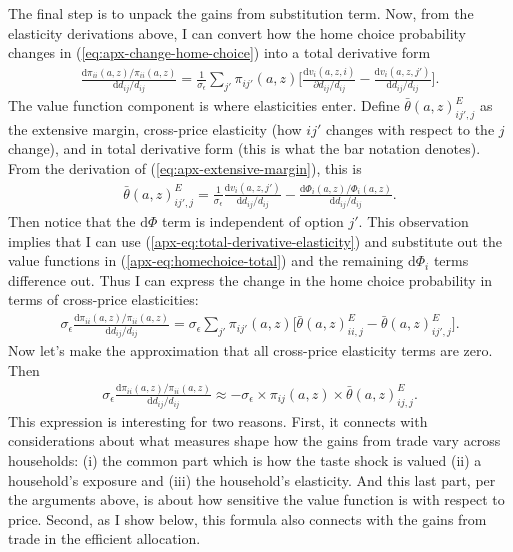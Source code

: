 \documentclass[12pt,pdftex]{article}
\begin{document}
\begin{onehalfspacing}
The final step is to unpack the gains from substitution term. Now, from the elasticity derivations above, I can convert how the home choice probability changes in (\ref{eq:apx-change-home-choice}) into a total derivative form
\begin{align}
\frac{\mathrm{d} \pi_{ii}(a,z) / \pi_{ii}(a,z) }{\mathrm{d} d_{ij} / d_{ij}} = \frac{1}{\sigma_{\epsilon}} \sum_{j'} \pi_{ij'}(a,z) \bigg[ \frac{\mathrm{d} v_{i}(a,z,i)}{\partial d_{ij}/d_{ij}} - \frac{\mathrm{d} v_{i}(a,z,j')}{\mathrm{d} d_{ij}/d_{ij}} \bigg].
\label{apx-eq:homechoice-total}
\end{align}
The value function component is where elasticities enter. Define $\bar{\theta}(a,z) ^E_{ij',j}$ as the extensive margin, cross-price elasticity (how $ij'$ changes with respect to the $j$ change), and in total derivative form (this is what the bar notation denotes). From the derivation of (\ref{eq:apx-extensive-margin}), this is
\begin{align}
\bar{\theta}(a,z) ^E_{ij',j} = \frac{1}{\sigma_{\epsilon}}\frac{\mathrm{d} v_{i}(a, z, j')}{\mathrm{d} d_{ij}/d_{ij}} -  \frac{\mathrm{d} \Phi_{i}(a,z) / \Phi_{i}(a,z)}{\mathrm{d} d_{ij}/d_{ij}}.
\label{apx-eq:total-derivative-elasticity}
\end{align}
Then notice that the $\mathrm{d} \Phi$ term is independent of option $j'$. This observation implies that I can use (\ref{apx-eq:total-derivative-elasticity}) and substitute out the value functions in (\ref{apx-eq:homechoice-total}) and the remaining $\mathrm{d} \Phi_{i}$ terms difference out. Thus I can express the change in the home choice probability in terms of cross-price elasticities:
\begin{align}
\sigma_{\epsilon} \frac{\mathrm{d} \pi_{ii}(a,z) / \pi_{ii}(a,z) }{\mathrm{d} d_{ij} / d_{ij}} = \sigma_{\epsilon} \sum_{j'} \pi_{ij'}(a,z) \bigg[ \bar{\theta}(a,z) ^E_{ii,j} - \bar{\theta}(a,z) ^E_{ij',j}\bigg].
\end{align}
Now let's make the approximation that all cross-price elasticity terms are zero. Then
\begin{align}
\sigma_{\epsilon} \frac{\mathrm{d} \pi_{ii}(a,z) / \pi_{ii}(a,z) }{\mathrm{d} d_{ij} / d_{ij}} \approx
- \sigma_{\epsilon} \times \pi_{ij}(a,z) \times \bar{\theta}(a,z) ^E_{ij,j}.
\end{align}
This expression is interesting for two reasons. First, it connects with considerations about what measures shape how the gains from trade vary across households: (i) the common part which is how the taste shock is valued (ii) a household's exposure and (iii) the household's elasticity. And this last part, per the arguments above, is about how sensitive the value function is with respect to price. Second, as I show below, this formula also connects with the gains from trade in the efficient allocation.



\end{onehalfspacing}
\end{document}
